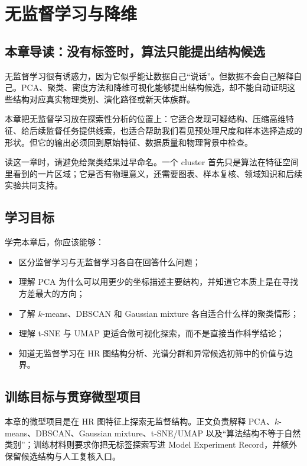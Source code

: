 \chapter{无监督学习与降维}

\section{本章导读：没有标签时，算法只能提出结构候选}

无监督学习很有诱惑力，因为它似乎能让数据自己“说话”。但数据不会自己解释自己。PCA、聚类、密度方法和降维可视化能够提出结构候选，却不能自动证明这些结构对应真实物理类别、演化路径或新天体族群。

本章把无监督学习放在探索性分析的位置上：它适合发现可疑结构、压缩高维特征、给后续监督任务提供线索，也适合帮助我们看见预处理尺度和样本选择造成的形状。但它的输出必须回到原始特征、数据质量和物理背景中检查。

读这一章时，请避免给聚类结果过早命名。一个 cluster 首先只是算法在特征空间里看到的一片区域；它是否有物理意义，还需要图表、样本复核、领域知识和后续实验共同支持。

\section{学习目标}

学完本章后，你应该能够：

\begin{itemize}
    \item 区分监督学习与无监督学习各自在回答什么问题；
    \item 理解 PCA 为什么可以用更少的坐标描述主要结构，并知道它本质上是在寻找方差最大的方向；
    \item 了解 $k$-means、DBSCAN 和 Gaussian mixture 各自适合什么样的聚类情形；
    \item 理解 t-SNE 与 UMAP 更适合做可视化探索，而不是直接当作科学结论；
    \item 知道无监督学习在 HR 图结构分析、光谱分群和异常候选初筛中的价值与边界。
\end{itemize}

\section{训练目标与贯穿微型项目}

本章的微型项目是在 HR 图特征上探索无监督结构。正文负责解释 PCA、\(k\)-means、DBSCAN、Gaussian mixture、t-SNE/UMAP 以及“算法结构不等于自然类别”；训练材料则要求你把无标签探索写进 Model Experiment Record，并额外保留候选结构与人工复核入口。

